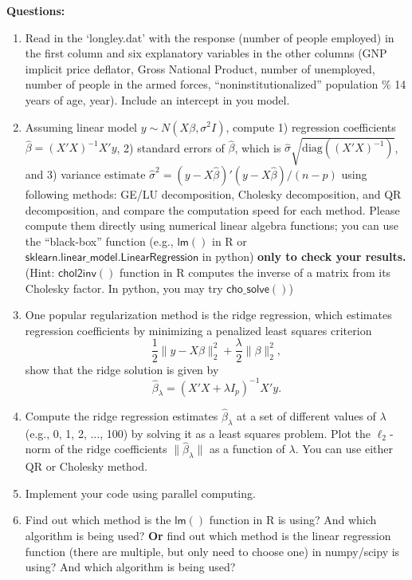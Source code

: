 \documentclass[twoside, letter]{article}
\begin{document}
{\Large \bf Questions:}
\begin{enumerate}
\item Read in the `longley.dat' with the response (number of people employed) in the first
column and six explanatory variables in the other columns (GNP implicit price deflator,
Gross National Product, number of unemployed, number of people in the armed forces,
``noninstitutionalized'' population \% 14 years of age, year). Include an intercept in you
model.

\item Assuming linear model $y \sim N(X\beta, \sigma^2 I)$, compute 
1) regression coefficients $\hat \beta = (X'X)^{-1} X'y$,
2) standard errors of $\hat \beta$, which is $\hat \sigma \sqrt{\text{diag}({(X'X)^{-1}})}$, 
and 3) variance estimate $\hat \sigma^2 = (y - X\hat \beta)'(y - X\hat \beta)/(n - p)$ using following methods: GE/LU decomposition, Cholesky decomposition, and QR decomposition, and compare the computation speed for each method. Please compute them directly using numerical linear algebra functions; you can use the ``black-box'' function (e.g., $\mathsf{lm()}$ in R or $\mathsf{sklearn.linear\_model.LinearRegression}$ in python) {\bf only to check your
results.} (Hint: $\mathsf{chol2inv()}$ function in R computes the inverse of a matrix from its Cholesky
factor. In python, you may try $\mathsf{cho\_solve()}$)


\item One popular regularization method is the ridge regression, which estimates regression
coefficients by minimizing a penalized least squares criterion
$$
\frac{1}{2} \|y - X\beta\|_2^2 + \frac{\lambda}{2} \|\beta\|_2^2,
$$
show that the ridge solution is given by 
$$
\hat \beta_\lambda = (X'X + \lambda I_p)^{-1} X'y.
$$

\item Compute the ridge regression estimates $\hat \beta_\lambda$ at a set of
different values of $\lambda$ (e.g., 0, 1, 2, $\dots$, 100) by solving it as a least squares problem. 
Plot the $\ell_2$-norm of the ridge coefficients $\|\hat \beta_\lambda\|$ as a function of $\lambda$.
You can use either QR or Cholesky method.

\item Implement your code using parallel computing.

\item Find out which method is the $\mathsf{lm()}$ function in R is
using? And which algorithm is being used?
{\bf Or} find out which method is the linear regression function (there are multiple, but only need to choose one) in numpy/scipy is using? And which algorithm is being used? 
\end{enumerate}




 
\end{document}
